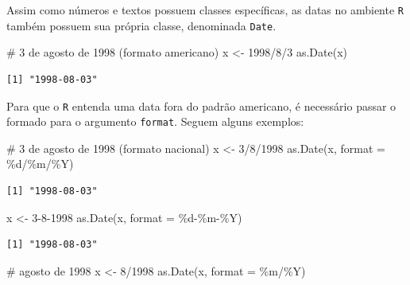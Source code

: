 \documentclass[
  letterpaper,
  DIV=11,
  numbers=noendperiod]{scrartcl}
\newenvironment{Shaded}{\begin{snugshade}}{\end{snugshade}}
\newcommand{\AttributeTok}[1]{\textcolor[rgb]{0.40,0.45,0.13}{#1}}
\newcommand{\CommentTok}[1]{\textcolor[rgb]{0.37,0.37,0.37}{#1}}
\newcommand{\FunctionTok}[1]{\textcolor[rgb]{0.28,0.35,0.67}{#1}}
\newcommand{\NormalTok}[1]{\textcolor[rgb]{0.00,0.23,0.31}{#1}}
\newcommand{\OtherTok}[1]{\textcolor[rgb]{0.00,0.23,0.31}{#1}}
\newcommand{\StringTok}[1]{\textcolor[rgb]{0.13,0.47,0.30}{#1}}
\theoremstyle{plain}
\theoremstyle{plain}
\theoremstyle{definition}
\theoremstyle{definition}
\theoremstyle{remark}
\begin{document}
Assim como números e textos possuem classes específicas, as datas no
ambiente \texttt{R} também possuem sua própria classe, denominada
\texttt{Date}.

\begin{Shaded}
\begin{Highlighting}[]
\CommentTok{\# 3 de agosto de 1998 (formato americano)}
\NormalTok{x }\OtherTok{\textless{}{-}} \StringTok{\textquotesingle{}1998/8/3\textquotesingle{}}
\FunctionTok{as.Date}\NormalTok{(x)}
\end{Highlighting}
\end{Shaded}

\begin{verbatim}
[1] "1998-08-03"
\end{verbatim}

Para que o \texttt{R} entenda uma data fora do padrão americano, é
necessário passar o formado para o argumento \texttt{format}. Seguem
alguns exemplos:

\begin{Shaded}
\begin{Highlighting}[]
\CommentTok{\# 3 de agosto de 1998 (formato nacional)}
\NormalTok{x }\OtherTok{\textless{}{-}} \StringTok{\textquotesingle{}3/8/1998\textquotesingle{}}
\FunctionTok{as.Date}\NormalTok{(x, }\AttributeTok{format =} \StringTok{\textquotesingle{}\%d/\%m/\%Y\textquotesingle{}}\NormalTok{)}
\end{Highlighting}
\end{Shaded}

\begin{verbatim}
[1] "1998-08-03"
\end{verbatim}

\begin{Shaded}
\begin{Highlighting}[]
\NormalTok{x }\OtherTok{\textless{}{-}} \StringTok{\textquotesingle{}3{-}8{-}1998\textquotesingle{}}
\FunctionTok{as.Date}\NormalTok{(x, }\AttributeTok{format =} \StringTok{\textquotesingle{}\%d{-}\%m{-}\%Y\textquotesingle{}}\NormalTok{)}
\end{Highlighting}
\end{Shaded}

\begin{verbatim}
[1] "1998-08-03"
\end{verbatim}

\begin{Shaded}
\begin{Highlighting}[]
\CommentTok{\# agosto de 1998}
\NormalTok{x }\OtherTok{\textless{}{-}} \StringTok{\textquotesingle{}8/1998\textquotesingle{}}
\FunctionTok{as.Date}\NormalTok{(x, }\AttributeTok{format =} \StringTok{\textquotesingle{}\%m/\%Y\textquotesingle{}}\NormalTok{)}
\end{Highlighting}
\end{Shaded}
\end{document}
